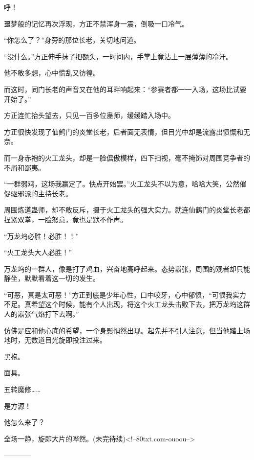 \begin{this_body}
呼！

噩梦般的记忆再次浮现，方正不禁浑身一震，倒吸一口冷气。

“你怎么了？”身旁的那位长老，关切地问道。

“没什么。”方正伸手抹了把额头，一时间内，手掌上竟沾上一层薄薄的冷汗。

他不敢多想，心中慌乱又彷徨。

而这时，同门长老的声音又在他的耳畔响起来：“参赛者都一一入场，这场比试要开始了。”

方正连忙抬头望去，只见一百多位蛊师，缓缓踏入场中。

方正很快发现了仙鹤门的炎堂长老，后者面无表情，但目光中却是流露出愤慨和无奈。

而一身赤袍的火工龙头，却是一脸倨傲模样，四下扫视，毫不掩饰对周围竞争者的不屑和鄙夷。

“一群弱鸡，这场我赢定了。快点开始罢。”火工龙头不以为意，哈哈大笑，公然催促驱邪派的主持长老。

周围炼道蛊师，却不敢反斥，摄于火工龙头的强大实力。就连仙鹤门的炎堂长老都捏紧双拳，一脸怒意，竟也是默不作声。

“万龙坞必胜！必胜！！”

“火工龙头大人必胜！”

万龙坞的一群人，像是打了鸡血，兴奋地高呼起来。态势嚣张，周围的观者却只能静坐，默默看着这一切的发生。

“可恶，真是太可恶！”方正到底是少年心性，口中咬牙，心中郁愤，“可恨我实力不足。真希望这个时候，能有个人出现，将这个火工龙头击败下去，把万龙坞这群人的嚣张气焰打下去啊。”

仿佛是应和他心底的希望，一个身影悄然出现。起先并不引人注意，但当他踏上场地时，无数道目光旋即投注过来。

黑袍。

面具。

五转魔修……

是方源！

他怎么来了？

全场一静，旋即大片的哗然。(未完待续)<!--80txt.com-ouoou-->

------------

\end{this_body}

